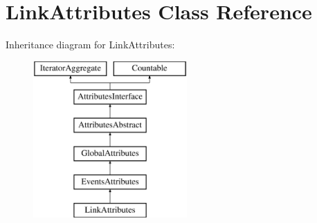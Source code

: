 \hypertarget{class_pes_1_1_dom_1_1_node_1_1_attributes_1_1_link_attributes}{}\section{Link\+Attributes Class Reference}
\label{class_pes_1_1_dom_1_1_node_1_1_attributes_1_1_link_attributes}
Inheritance diagram for Link\+Attributes\+:\begin{figure}[H]
\begin{center}
\leavevmode
\includegraphics[height=6.000000cm]{class_pes_1_1_dom_1_1_node_1_1_attributes_1_1_link_attributes}
\end{center}
\end{figure}
